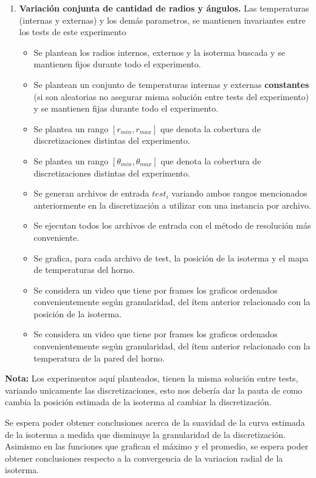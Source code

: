 \begin{enumerate}
    \item \textbf{Variación conjunta de cantidad de radios y ángulos.} Las temperaturas (internas y externas) y los demás parametros, se mantienen invariantes entre los tests de este experimento\begin{itemize}
        \item Se plantean los radios internos, externos y la isoterma buscada y se mantienen fijos durante todo el experimento.
        \item Se plantean un conjunto de temperaturas internas y externas \textbf{constantes} (si son aleatorias no asegurar misma solución entre tests del experimento) y se mantienen fijas durante todo el experimento.
        \item Se plantea un rango $[r_{min}, r_{max}]$ que denota la cobertura de discretizaciones distintas del experimento.        
        \item Se plantea un rango $[\theta_{min}, \theta_{max}]$ que denota la cobertura de discretizaciones distintas del experimento.
        \item Se generan archivos de entrada $test_i$ variando ambos rangos mencionados anteriormente en la discretización a utilizar con una instancia por archivo.
        \item Se ejecutan todos los archivos de entrada con el método de resolución más conveniente.
        \item Se grafica, para cada archivo de test, la posición de la isoterma y el mapa de temperaturas del horno.
        \item Se considera un video que tiene por frames los graficos ordenados convenientemente según granularidad, del ítem anterior relacionado con la posición de la isoterma.
        \item Se considera un video que tiene por frames los graficos ordenados convenientemente según granularidad, del ítem anterior relacionado con la temperatura de la pared del horno.
    \end{itemize}    
\end{enumerate}

\textbf{Nota:} Los experimentos aquí planteados, tienen la misma solución entre tests, variando unicamente las discretizaciones, esto nos debería dar la pauta de como cambia la posición estimada de la isoterma al cambiar la discretización.

Se espera poder obtener conclusiones acerca de la suavidad de la curva estimada de la isoterma a medida que disminuye la granularidad de la discretización. Asimismo en las funciones que grafican el máximo y el promedio, se espera poder obtener conclusiones respecto a la convergencia de la variacion radial de la isoterma.\\

